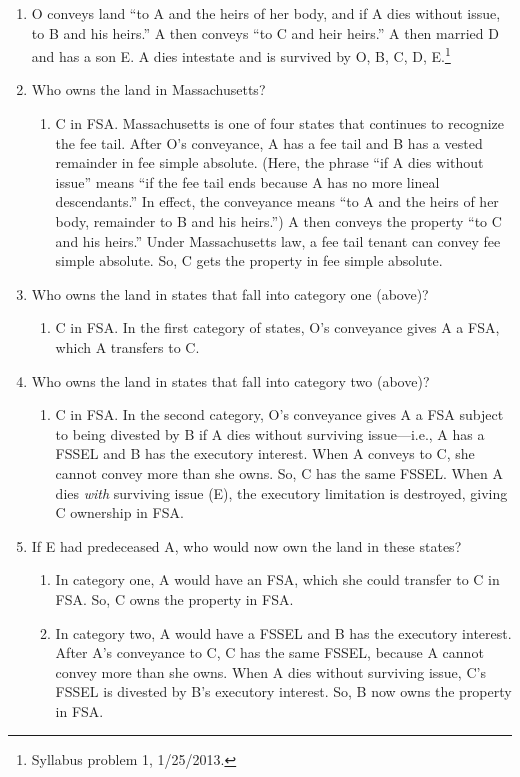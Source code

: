 \begin{enumerate}
    \item O conveys land ``to A and the heirs of her body, and if A dies 
    without issue, to B and his heirs.'' A then conveys ``to C and heir 
    heirs.'' A then married D and has a son E. A dies intestate and is 
    survived by O, B, C, D, E.\footnote{Syllabus problem 1, 1/25/2013.}
    \item Who owns the land in Massachusetts?
    \begin{enumerate}
        \item C in FSA. Massachusetts is one of four states that continues to 
        recognize the fee tail. After O's conveyance, A has a fee tail and B 
        has a vested remainder in fee simple absolute. (Here, the phrase ``if 
        A dies without issue'' means ``if the fee tail ends because A has no 
        more lineal descendants.'' In effect, the conveyance means ``to A and 
        the heirs of her body, remainder to B and his heirs.'') A then conveys 
        the property ``to C and his heirs.'' Under Massachusetts law, a fee 
        tail tenant can convey fee simple absolute. So, C gets the property 
        in fee simple absolute.
    \end{enumerate}
    \item Who owns the land in states that fall into category one (above)?
    \begin{enumerate}
        \item C in FSA. In the first category of states, O's conveyance gives 
        A a FSA, which A transfers to C.
    \end{enumerate}
    \item Who owns the land in states that fall into category two (above)?
    \begin{enumerate}
        \item C in FSA. In the second category, O's conveyance gives A a FSA 
        subject to being divested by B if A dies without surviving 
        issue---i.e., A has a FSSEL and B has the executory interest. When A 
        conveys to C, she cannot convey more than she owns. So, C has the same 
        FSSEL. When A dies \emph{with} surviving issue (E), the executory 
        limitation is destroyed, giving C ownership in FSA.
    \end{enumerate}
    \item If E had predeceased A, who would now own the land in these states?
    \begin{enumerate}
        \item In category one, A would have an FSA, which she could transfer 
        to C in FSA. So, C owns the property in FSA.
        \item In category two, A would have a FSSEL and B has the executory 
        interest. After A's conveyance to C, C has the same FSSEL, because A 
        cannot convey more than she owns. When A dies without surviving issue, 
        C's FSSEL is divested by B's executory interest. So, B now owns the 
        property in FSA.
    \end{enumerate}
\end{enumerate}

